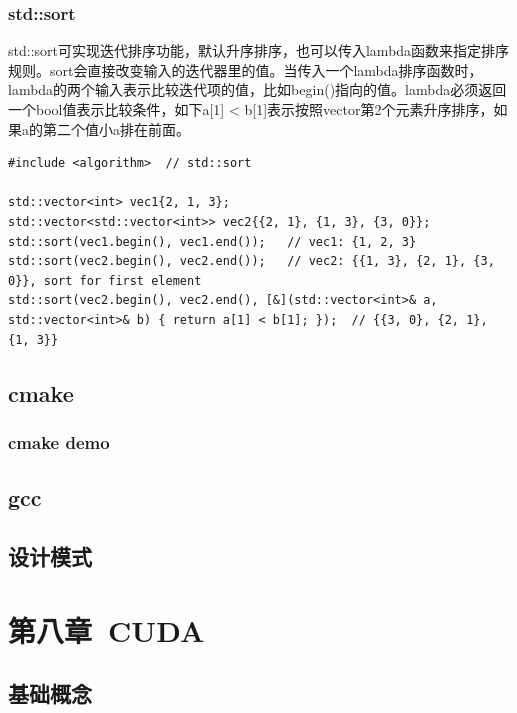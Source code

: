 \documentclass[12pt]{book}
\begin{document}
\subsection{std::sort}
std::sort可实现迭代排序功能，默认升序排序，也可以传入lambda函数来指定排序规则。sort会直接改变输入的迭代器里的值。当传入一个lambda排序函数时，lambda的两个输入表示比较迭代项的值，比如begin()指向的值。lambda必须返回一个bool值表示比较条件，如下a[1] < b[1]表示按照vector第2个元素升序排序，如果a的第二个值小a排在前面。
\begin{lstlisting}
#include <algorithm>  // std::sort

std::vector<int> vec1{2, 1, 3};
std::vector<std::vector<int>> vec2{{2, 1}, {1, 3}, {3, 0}};
std::sort(vec1.begin(), vec1.end());   // vec1: {1, 2, 3}
std::sort(vec2.begin(), vec2.end());   // vec2: {{1, 3}, {2, 1}, {3, 0}}, sort for first element
std::sort(vec2.begin(), vec2.end(), [&](std::vector<int>& a, std::vector<int>& b) { return a[1] < b[1]; });  // {{3, 0}, {2, 1}, {1, 3}}
\end{lstlisting}

\section{cmake}
\subsection{cmake demo}
\section{gcc}
\section{设计模式}

\newpage

\fancyhead{}

\chapter{第八章\ CUDA}
\section{基础概念}
\end{document}
